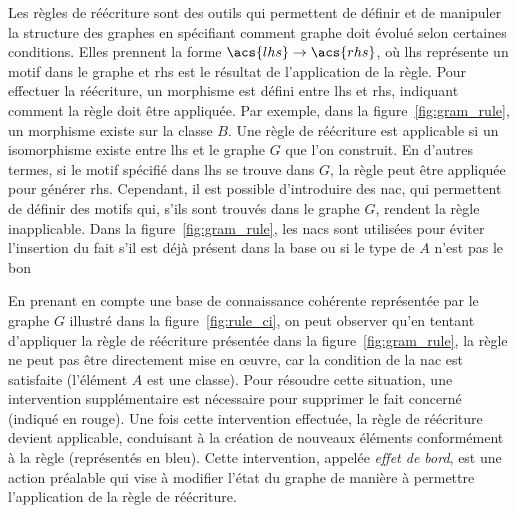 Les règles de réécriture sont des outils qui permettent de définir et de manipuler la structure des graphes en spécifiant comment graphe doit évolué selon certaines conditions.
Elles prennent la forme $\acs{lhs} \to \acs{rhs}$, où \gls{lhs} représente un motif dans le graphe et \gls{rhs} est le résultat de l'application de la règle.
Pour effectuer la réécriture, un morphisme est défini entre \gls{lhs} et \gls{rhs}, indiquant comment la règle doit être appliquée.
Par exemple, dans la figure~\ref{fig:gram_rule}, un morphisme existe sur la classe $B$.
Une règle de réécriture est applicable si un isomorphisme existe entre \gls{lhs} et le graphe $G$ que l'on construit.
En d'autres termes, si le motif spécifié dans \gls{lhs} se trouve dans $G$, la règle peut être appliquée pour générer \gls{rhs}.
Cependant, il est possible d'introduire des \gls{nac}, qui permettent de définir des motifs qui, s'ils sont trouvés dans le graphe $G$, rendent la règle inapplicable.
Dans la figure~\ref{fig:gram_rule}, les \gls{nac}s sont utilisées pour éviter l'insertion du fait s'il est déjà présent dans la base ou si le type de $A$ n'est pas le bon

\begin{example}
    En prenant en compte une base de connaissance cohérente représentée par le graphe $G$ illustré dans la figure~\ref{fig:rule_ci}, on peut observer qu'en tentant d'appliquer la règle de réécriture présentée dans la figure~\ref{fig:gram_rule}, la règle ne peut pas être directement mise en œuvre, car la condition de la \gls{nac} est satisfaite (l'élément $A$ est une classe).
    Pour résoudre cette situation, une intervention supplémentaire est nécessaire pour supprimer le fait concerné (indiqué en rouge).
    Une fois cette intervention effectuée, la règle de réécriture devient applicable, conduisant à la création de nouveaux éléments conformément à la règle (représentés en bleu).
    Cette intervention, appelée \emph{effet de bord}, est une action préalable qui vise à modifier l'état du graphe de manière à permettre l'application de la règle de réécriture.
\end{example}

